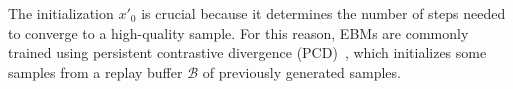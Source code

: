 \documentclass{article}
\begin{document}
The initialization $x'_0$ is crucial because it determines the number of steps needed to converge to a high-quality sample. For this reason, EBMs are commonly trained \cite{nijkamp2019anatomy, du2019implicit, grathwohl2019your} using persistent contrastive divergence (PCD)~\cite{tieleman2008training}, which initializes some samples from a replay buffer $\mathcal{B}$ of previously generated samples.

\comment{



}
\end{document}
